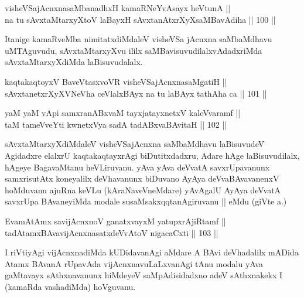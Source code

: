 \begin{shl}
visheVSajAcnxnasaMbanadhxH kamaRNeYvAsayx heVtunA || \\
na tu sAvxtaMtarxyXtoV laBayxH sAvxtanAtxrXyXsaMBavAdiha \hfill || 100 ||  
\end{shl}

\begin{artha}
Itanige kamaRveMba nimitatxdiMdaleV visheVSa jAcnxna saMbaMdhavu
uMTAguvudu, sAvxtaMtarxyXvu ililx saMBavisuvudilalxvAdadxriMda
sAvxtaMtarxyXdiMda laBisuvudalalx.
\end{artha}


\begin{shl}
kaqtakaqtoyxV BaveVtasxvoVR visheVSajAcnxnasaMgatiH || \\
sAvxtanetxrXyXVNeVha ceVlalxBAyx na tu laBAyx tathA\s \s ha ca \hfill || 101 || 
\end{shl}

\begin{shl}
yaM yaM vA\s pi samxranABxvaM tayxjatayxnetxV kaleVvaramf ||  \\
taM tameVveYti kwnetxVya sadA tadABxvaBAvitaH \hfill || 102 ||  
\end{shl}

\begin{artha}
sAvxtaMtarxyXdiMdaleV visheVSajAcnxna saMbaMdhavu laBisuvudeV
Agidadxre elalxrU kaqtakaqtayxrAgi biDutitxdadxru, Adare hAge
laBisuvudilalx, hAgeye BagavaMtanu heVLiruvanu. yAva yAva deVvatA
savxrUpavanunx samxrisutAtx koneyalilx deVhavanunx biDuvano AyAya
deVvaBAvavanenxV hoMduvanu ajuRna keVLu (kAraNaveVneMdare) yAvAgalU
AyAya deVvatA savxrUpa BAvaneyiMda modale susaMsakxqqtanAgiruvanu ||
eMdu (giVte  a.\quad) 
\end{artha}


\begin{shl}
EvamAtAmx savijAcnxnoV ganatxvayxM yatupxrA\s jiRtamf || \\
tadAtamxBAvavijAcnxnasatxdeVvAtoV nigacaCxti \hfill || 103 ||  
\end{shl}

\begin{artha}
I riVtiyAgi vijAcnxnadiMda kUDidavanAgi aMdare A BAvi deVhadalilx
mADida Atamx BAvanA rUpavAda vijAcnxnavuLaLxvanAgi tAnu modalu yAva
gaMtavayx sAthxnavanunx hiMdeyeV saMpAdisidadxno adeV sAthxnakekx I
(kamaRda vashadiMda) hoVguvanu.
\end{artha}


